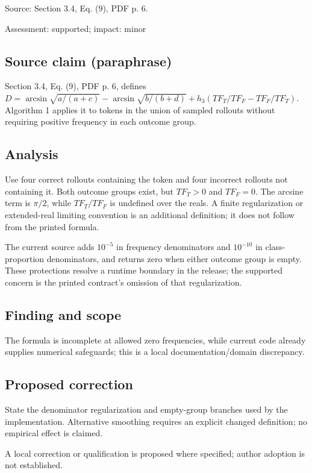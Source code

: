 \documentclass[11pt]{article}
\begin{document}
Source: Section 3.4, Eq. (9), PDF p. 6.

Assessment: supported; impact: minor

\subsection*{Source claim (paraphrase)}

Section 3.4, Eq. (9), PDF p. 6, defines \(D=\arcsin\sqrt{a/(a+c)}-\arcsin\sqrt{b/(b+d)}+h_3(TF_T/TF_F-TF_F/TF_T)\). Algorithm 1 applies it to tokens in the union of sampled rollouts without requiring positive frequency in each outcome group.

\subsection*{Analysis}

Use four correct rollouts containing the token and four incorrect rollouts not containing it. Both outcome groups exist, but \(TF_T>0\) and \(TF_F=0\). The arcsine term is \(\pi/2\), while \(TF_T/TF_F\) is undefined over the reals. A finite regularization or extended-real limiting convention is an additional definition; it does not follow from the printed formula.

The current source adds \(10^{-5}\) in frequency denominators and \(10^{-10}\) in class-proportion denominators, and returns zero when either outcome group is empty. These protections resolve a runtime boundary in the release; the supported concern is the printed contract’s omission of that regularization.

\subsection*{Finding and scope}

The formula is incomplete at allowed zero frequencies, while current code already supplies numerical safeguards; this is a local documentation/domain discrepancy.

\subsection*{Proposed correction}

State the denominator regularization and empty-group branches used by the implementation. Alternative smoothing requires an explicit changed definition; no empirical effect is claimed.

A local correction or qualification is proposed where specified; author adoption is not established.
\end{document}
